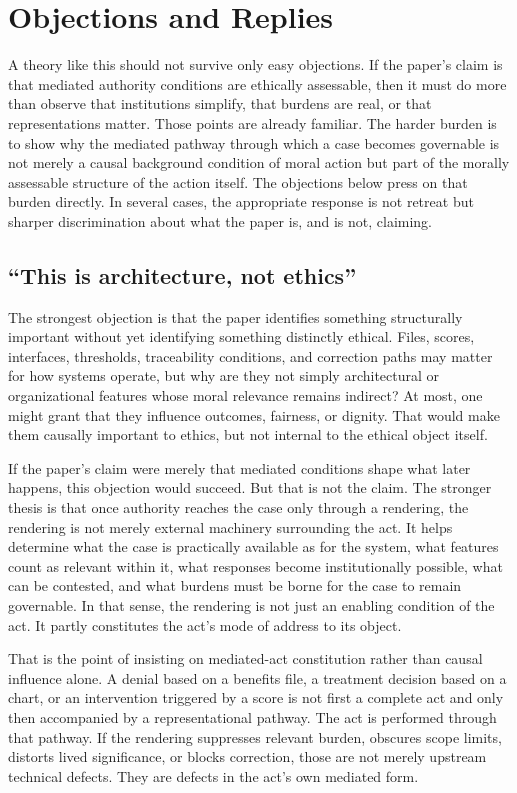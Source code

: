 \documentclass[11pt]{article}
\begin{document}
\section{Objections and Replies}

A theory like this should not survive only easy objections. If the paper's claim is that mediated authority conditions are ethically assessable, then it must do more than observe that institutions simplify, that burdens are real, or that representations matter. Those points are already familiar. The harder burden is to show why the mediated pathway through which a case becomes governable is not merely a causal background condition of moral action but part of the morally assessable structure of the action itself. The objections below press on that burden directly. In several cases, the appropriate response is not retreat but sharper discrimination about what the paper is, and is not, claiming.

\subsection{``This is architecture, not ethics''}

The strongest objection is that the paper identifies something structurally important without yet identifying something distinctly ethical. Files, scores, interfaces, thresholds, traceability conditions, and correction paths may matter for how systems operate, but why are they not simply architectural or organizational features whose moral relevance remains indirect? At most, one might grant that they influence outcomes, fairness, or dignity. That would make them causally important to ethics, but not internal to the ethical object itself.

If the paper's claim were merely that mediated conditions shape what later happens, this objection would succeed. But that is not the claim. The stronger thesis is that once authority reaches the case only through a rendering, the rendering is not merely external machinery surrounding the act. It helps determine what the case is practically available as for the system, what features count as relevant within it, what responses become institutionally possible, what can be contested, and what burdens must be borne for the case to remain governable. In that sense, the rendering is not just an enabling condition of the act. It partly constitutes the act's mode of address to its object.

That is the point of insisting on mediated-act constitution rather than causal influence alone. A denial based on a benefits file, a treatment decision based on a chart, or an intervention triggered by a score is not first a complete act and only then accompanied by a representational pathway. The act is performed through that pathway. If the rendering suppresses relevant burden, obscures scope limits, distorts lived significance, or blocks correction, those are not merely upstream technical defects. They are defects in the act's own mediated form.
\end{document}
